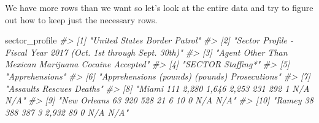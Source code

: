 \documentclass[
  12pt,
]{book}
\newenvironment{Shaded}{\begin{snugshade}}{\end{snugshade}}
\newcommand{\CommentTok}[1]{\textcolor[rgb]{0.37,0.37,0.37}{\textit{#1}}}
\newcommand{\NormalTok}[1]{#1}
\begin{document}
We have more rows than we want so let's look at the entire data and try to figure out how to keep just the necessary rows.

\begin{Shaded}
\begin{Highlighting}[]
\NormalTok{sector\_profile}
\CommentTok{\#\textgreater{}  [1] "United States Border Patrol"                                                                                                                                                                         }
\CommentTok{\#\textgreater{}  [2] "Sector Profile {-} Fiscal Year 2017 (Oct. 1st through Sept. 30th)"                                                                                                                                     }
\CommentTok{\#\textgreater{}  [3] "Agent                              Other Than Mexican           Marijuana          Cocaine         Accepted"                                                                                         }
\CommentTok{\#\textgreater{}  [4] "SECTOR                            Staffing*"                                                                                                                                                         }
\CommentTok{\#\textgreater{}  [5] "Apprehensions"                                                                                                                                                                                       }
\CommentTok{\#\textgreater{}  [6] "Apprehensions                (pounds)          (pounds)    Prosecutions"                                                                                                                             }
\CommentTok{\#\textgreater{}  [7] "Assaults Rescues       Deaths"                                                                                                                                                                       }
\CommentTok{\#\textgreater{}  [8] "Miami                                             111               2,280                    1,646                   2,253             231              292               1           N/A     N/A"   }
\CommentTok{\#\textgreater{}  [9] "New Orleans                                        63                920                      528                      21                6               10               0           N/A     N/A"   }
\CommentTok{\#\textgreater{} [10] "Ramey                                              38                388                      387                       3             2,932              89               0           N/A     N/A"   }

\end{Highlighting}
\end{Shaded}
\end{document}
